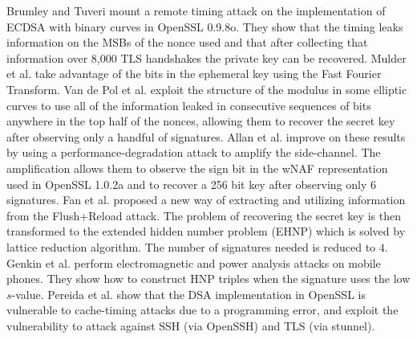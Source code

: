 Brumley and Tuveri \cite{Brumley2011} mount a remote timing attack on the implementation of ECDSA with binary curves in OpenSSL 0.9.8o.
 They show that the timing leaks information on the MSBs of the nonce used and that after collecting that information over 8,000 TLS handshakes the private key can be recovered.
Mulder et al. \cite{Mulder2013} take advantage of the bits in the ephemeral key using the Fast Fourier Transform.
Van de Pol et al. \cite{Van2015} exploit the structure of the modulus in some elliptic curves to use all of the information leaked in consecutive sequences of bits anywhere in the top half of the nonces, allowing them to recover the secret key after observing only a handful of signatures.
Allan et al. \cite{Allan2016} improve on these results by using a performance-degradation attack to amplify the side-channel. The amplification allows them
to observe the sign bit in the wNAF representation used in OpenSSL 1.0.2a and to recover a 256 bit key after observing only 6 signatures.
Fan et al. \cite{Fan2016} proposed a new way of extracting and utilizing information from the Flush+Reload attack. The problem of recovering the
secret key is then transformed to the extended hidden number problem (EHNP) which is solved by lattice reduction algorithm. The number of signatures needed is reduced to $4$.
Genkin et al. \cite{Genkin2016} perform electromagnetic and power analysis attacks on mobile phones. They show how to construct HNP triples when the signature uses the low $s$-value.
Pereida et al. \cite{Pereida2016} show that the DSA implementation in OpenSSL is vulnerable to cache-timing attacks due to a programming error, and exploit the vulnerability to attack against SSH (via OpenSSH) and TLS (via stunnel).




